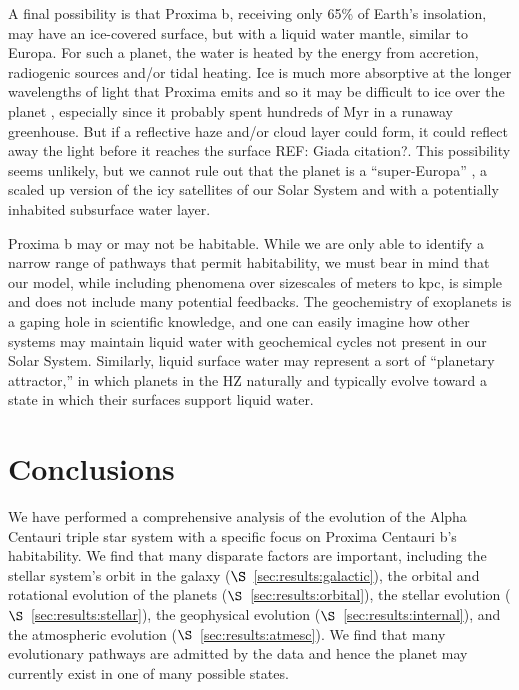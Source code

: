 \documentclass[preprint,12pt]{aastex}
\newcommand{\xxx}[1]{{\color{red} #1}} %
\begin{document}
A final possibility is that Proxima b, receiving only 65\% of Earth's
insolation, may have an ice-covered surface, but with a liquid water
mantle, similar to Europa. For such a planet, the water is heated by
the energy from accretion, radiogenic sources and/or tidal
heating. Ice is much more absorptive at the longer wavelengths of
light that Proxima emits and so it may be difficult to ice over the
planet \citep{JoshiHaberle12,Shields13}, especially since it probably spent
hundreds of Myr in a runaway greenhouse. But if a reflective haze
and/or cloud layer could form, it could reflect away the light before
it reaches the surface \xxx{REF: Giada citation?}. This possibility seems unlikely, but we cannot
rule out that the planet is a ``super-Europa'' \citep{BarnesHeller13},
a scaled up version of the icy satellites of our Solar System and with
a potentially inhabited subsurface water layer.

Proxima b may or may not be habitable. While we are only able to
identify a narrow range of pathways that permit habitability, we must
bear in mind that our model, while including phenomena over sizescales
of meters to kpc, is simple and does not include many potential
feedbacks. The geochemistry of exoplanets is a gaping hole in
scientific knowledge, and one can easily imagine how other systems may
maintain liquid water with geochemical cycles not present in our Solar
System. Similarly, liquid surface water may represent a sort of
``planetary attractor,'' in which planets in the HZ naturally and
typically evolve toward a state in which their surfaces support liquid
water. 

\section{Conclusions\label{sec:concl}}
We have performed a comprehensive analysis of the evolution of the
Alpha Centauri triple star system with a specific focus on Proxima Centauri b's
habitability. We find that many disparate factors are important,
including the stellar system's orbit in the galaxy
($\S$~\ref{sec:results:galactic}), the orbital and rotational evolution of
the planets ($\S$~\ref{sec:results:orbital}), the stellar evolution
($\S$~\ref{sec:results:stellar}), the geophysical evolution
($\S$~\ref{sec:results:internal}), and the atmospheric evolution
($\S$~\ref{sec:results:atmesc}). We find that many evolutionary pathways
are admitted by the data and hence the planet may currently exist in
one of many possible states.
\end{document}
